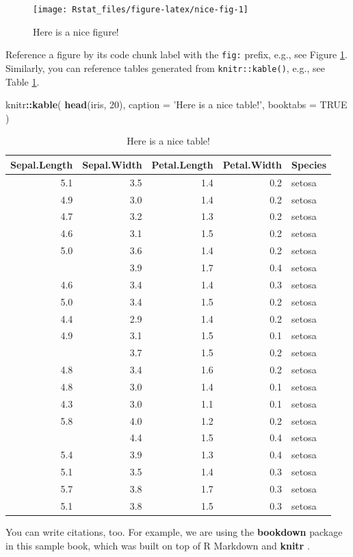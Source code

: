 \documentclass[]{book}
\newenvironment{Shaded}{\begin{snugshade}}{\end{snugshade}}
\newcommand{\KeywordTok}[1]{\textcolor[rgb]{0.13,0.29,0.53}{\textbf{#1}}}
\newcommand{\DataTypeTok}[1]{\textcolor[rgb]{0.13,0.29,0.53}{#1}}
\newcommand{\DecValTok}[1]{\textcolor[rgb]{0.00,0.00,0.81}{#1}}
\newcommand{\StringTok}[1]{\textcolor[rgb]{0.31,0.60,0.02}{#1}}
\newcommand{\OtherTok}[1]{\textcolor[rgb]{0.56,0.35,0.01}{#1}}
\newcommand{\OperatorTok}[1]{\textcolor[rgb]{0.81,0.36,0.00}{\textbf{#1}}}
\newcommand{\NormalTok}[1]{#1}
\begin{document}
\begin{figure}

{\centering \texttt{[image: Rstat\_files/figure-latex/nice-fig-1]} 

}

\caption{Here is a nice figure!}\label{fig:nice-fig}
\end{figure}

Reference a figure by its code chunk label with the \texttt{fig:} prefix, e.g., see Figure \ref{fig:nice-fig}. Similarly, you can reference tables generated from \texttt{knitr::kable()}, e.g., see Table \ref{tab:nice-tab}.

\begin{Shaded}
\begin{Highlighting}[]
\NormalTok{knitr}\OperatorTok{::}\KeywordTok{kable}\NormalTok{(}
  \KeywordTok{head}\NormalTok{(iris, }\DecValTok{20}\NormalTok{), }\DataTypeTok{caption =} \StringTok{'Here is a nice table!'}\NormalTok{,}
  \DataTypeTok{booktabs =} \OtherTok{TRUE}
\NormalTok{)}
\end{Highlighting}
\end{Shaded}

\begin{table}[t]

\caption{\label{tab:nice-tab}Here is a nice table!}
\centering
\begin{tabular}{rrrrl}
\toprule
Sepal.Length & Sepal.Width & Petal.Length & Petal.Width & Species\\
\midrule
5.1 & 3.5 & 1.4 & 0.2 & setosa\\
4.9 & 3.0 & 1.4 & 0.2 & setosa\\
4.7 & 3.2 & 1.3 & 0.2 & setosa\\
4.6 & 3.1 & 1.5 & 0.2 & setosa\\
5.0 & 3.6 & 1.4 & 0.2 & setosa\\
\addlinespace
5.4 & 3.9 & 1.7 & 0.4 & setosa\\
4.6 & 3.4 & 1.4 & 0.3 & setosa\\
5.0 & 3.4 & 1.5 & 0.2 & setosa\\
4.4 & 2.9 & 1.4 & 0.2 & setosa\\
4.9 & 3.1 & 1.5 & 0.1 & setosa\\
\addlinespace
5.4 & 3.7 & 1.5 & 0.2 & setosa\\
4.8 & 3.4 & 1.6 & 0.2 & setosa\\
4.8 & 3.0 & 1.4 & 0.1 & setosa\\
4.3 & 3.0 & 1.1 & 0.1 & setosa\\
5.8 & 4.0 & 1.2 & 0.2 & setosa\\
\addlinespace
5.7 & 4.4 & 1.5 & 0.4 & setosa\\
5.4 & 3.9 & 1.3 & 0.4 & setosa\\
5.1 & 3.5 & 1.4 & 0.3 & setosa\\
5.7 & 3.8 & 1.7 & 0.3 & setosa\\
5.1 & 3.8 & 1.5 & 0.3 & setosa\\
\bottomrule
\end{tabular}
\end{table}

You can write citations, too. For example, we are using the \textbf{bookdown} package \citep{R-bookdown} in this sample book, which was built on top of R Markdown and \textbf{knitr} \citep{xie2015}.


\end{document}
